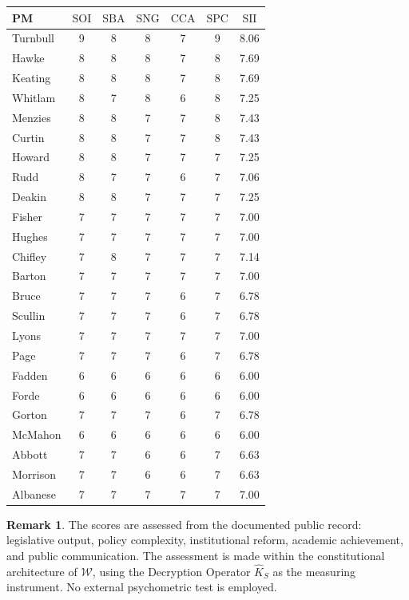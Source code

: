 \documentclass[12pt,anyside]{book}
\theoremstyle{plain}
\theoremstyle{definition}
\newtheorem{remark}{Remark}[chapter]
\newcommand{\W}{\mathcal{W}}          %
\newcommand{\Khat}{\hat{K}_S}          %
\newcommand{\SII}{\mathrm{SII}}        %
\newcommand{\SOI}{\mathrm{SOI}}        %
\newcommand{\SBA}{\mathrm{SBA}}        %
\newcommand{\SNG}{\mathrm{SNG}}        %
\newcommand{\CCA}{\mathrm{CCA}}        %
\newcommand{\SPC}{\mathrm{SPC}}        %
\begin{document}
\begin{center}
\begin{tabular}{lccccc|c}
\toprule
\textbf{PM} & $\SOI$ & $\SBA$ & $\SNG$ & $\CCA$ & $\SPC$ & $\SII$ \\
\midrule
Turnbull    & 9 & 8 & 8 & 7 & 9 & 8.06 \\
Hawke       & 8 & 8 & 8 & 7 & 8 & 7.69 \\
Keating     & 8 & 8 & 8 & 7 & 8 & 7.69 \\
Whitlam     & 8 & 7 & 8 & 6 & 8 & 7.25 \\
Menzies     & 8 & 8 & 7 & 7 & 8 & 7.43 \\
Curtin      & 8 & 8 & 7 & 7 & 8 & 7.43 \\
Howard      & 8 & 8 & 7 & 7 & 7 & 7.25 \\
Rudd        & 8 & 7 & 7 & 6 & 7 & 7.06 \\
Deakin      & 8 & 8 & 7 & 7 & 7 & 7.25 \\
Fisher      & 7 & 7 & 7 & 7 & 7 & 7.00 \\
Hughes      & 7 & 7 & 7 & 7 & 7 & 7.00 \\
Chifley     & 7 & 8 & 7 & 7 & 7 & 7.14 \\
Barton      & 7 & 7 & 7 & 7 & 7 & 7.00 \\
Bruce         & 7 & 7 & 7 & 6 & 7 & 6.78 \\
Scullin     & 7 & 7 & 7 & 6 & 7 & 6.78 \\
Lyons       & 7 & 7 & 7 & 7 & 7 & 7.00 \\
Page        & 7 & 7 & 7 & 6 & 7 & 6.78 \\
Fadden      & 6 & 6 & 6 & 6 & 6 & 6.00 \\
Forde       & 6 & 6 & 6 & 6 & 6 & 6.00 \\
Gorton      & 7 & 7 & 7 & 6 & 7 & 6.78 \\
McMahon     & 6 & 6 & 6 & 6 & 6 & 6.00 \\
Abbott      & 7 & 7 & 6 & 6 & 7 & 6.63 \\
Morrison    & 7 & 7 & 6 & 6 & 7 & 6.63 \\
Albanese    & 7 & 7 & 7 & 7 & 7 & 7.00 \\
\bottomrule
\end{tabular}
\end{center}

\begin{remark}
The scores are assessed from the documented public record: legislative output, policy complexity, institutional reform, academic achievement, and public communication. The assessment is made within the constitutional architecture of $\W$, using the Decryption Operator $\Khat$ as the measuring instrument. No external psychometric test is employed.
\end{remark}
\end{document}
